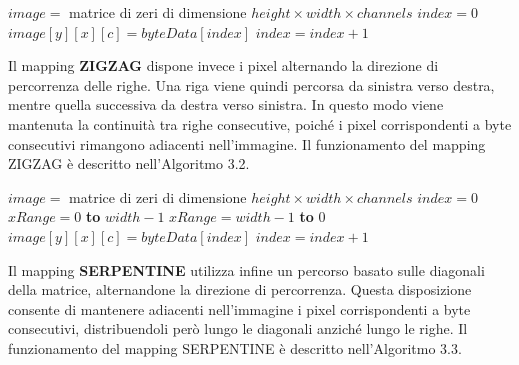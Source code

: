 \begin{algorithm}[H]
    \caption{Pseudocodice del mapping LINEAR}
    \label{alg:linear_mapping}
    \begin{algorithmic}[1]
        \State $image =$ matrice di zeri di dimensione
        $height \times width \times channels$
        \State $index = 0$
                        \State $image[y][x][c] = byteData[index]$
                        \State $index = index + 1$
                    \EndIf
                \EndFor
            \EndFor
        \EndFor
    \end{algorithmic}
\end{algorithm}

Il mapping \textbf{ZIGZAG} dispone invece i pixel alternando la
direzione di percorrenza delle righe. Una riga viene quindi percorsa
da sinistra verso destra, mentre quella successiva da destra verso
sinistra. In questo modo viene mantenuta la continuità tra righe
consecutive, poiché i pixel corrispondenti a byte consecutivi
rimangono adiacenti nell'immagine.
Il funzionamento del mapping ZIGZAG è descritto nell'Algoritmo 3.2.

\begin{algorithm}[H]
    \caption{Pseudocodice del mapping ZIGZAG}
    \label{alg:zigzag_mapping}
    \begin{algorithmic}[1]
        \State $image =$ matrice di zeri di dimensione
        $height \times width \times channels$
        \State $index = 0$
                \State $xRange = 0$ \textbf{to} $width - 1$
            \Else
                \State $xRange = width - 1$ \textbf{to} $0$
            \EndIf
                        \State $image[y][x][c] = byteData[index]$
                        \State $index = index + 1$
                    \EndIf
                \EndFor
            \EndFor
        \EndFor
    \end{algorithmic}
\end{algorithm}

Il mapping \textbf{SERPENTINE} utilizza infine un percorso basato
sulle diagonali della matrice, alternandone la direzione di
percorrenza. Questa disposizione consente di mantenere adiacenti
nell'immagine i pixel corrispondenti a byte consecutivi, distribuendoli
però lungo le diagonali anziché lungo le righe.
Il funzionamento del mapping SERPENTINE è descritto nell'Algoritmo 3.3.


